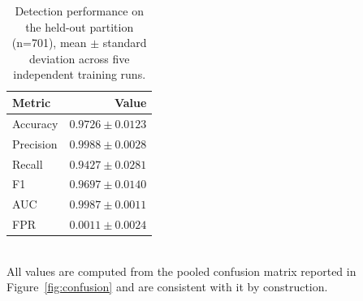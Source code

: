 \begin{table}[htbp]
\centering
\caption{Detection performance on the held-out partition (n=701), mean $\pm$ standard deviation across five independent training runs.}
\label{tab:detection}
\begin{tabular}{lr}
\hline
Metric & Value \\
\hline
Accuracy & $0.9726 \pm 0.0123$ \\
Precision & $0.9988 \pm 0.0028$ \\
Recall & $0.9427 \pm 0.0281$ \\
F1 & $0.9697 \pm 0.0140$ \\
AUC & $0.9987 \pm 0.0011$ \\
FPR & $0.0011 \pm 0.0024$ \\
\hline
\end{tabular}
\\[2pt]\footnotesize{All values are computed from the pooled confusion matrix reported in Figure~\ref{fig:confusion} and are consistent with it by construction.}
\end{table}
